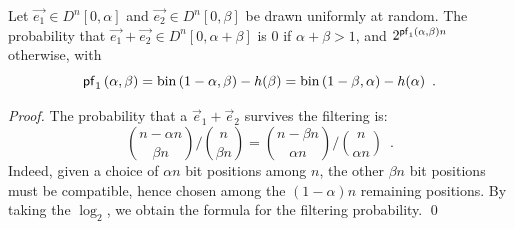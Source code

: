 \begin{lemma}
\label{lemma:hgj-filter}
Let $\vec{e_1} \in D^n[0, \alpha]$ and $\vec{e_2} \in D^n[0, \beta]$ be drawn uniformly at random. The probability that $\vec{e_1} + \vec{e_2} \in D^n[0, \alpha + \beta]$ is $0$ if $\alpha + \beta > 1$, and $2^{\mathsf{pf}_1 \left(\alpha, \beta \right)n}$ otherwise, with 
$$\mathsf{pf}_1 \left(\alpha, \beta \right) = \mathrm{bin}\left(1-\alpha,\beta\right) - h(\beta) = \mathrm{bin}\left(1-\beta,\alpha\right) - h(\alpha) \enspace.$$
\end{lemma}

\begin{proof}
The probability that a $\vec{e}_1 + \vec{e}_2$ survives the filtering is:
$$ {n - \alpha n \choose \beta n} / {n \choose \beta n} = {n - \beta n \choose \alpha n} / {n \choose \alpha n} \enspace.$$
Indeed, given a choice of $\alpha n$ bit positions among $n$, the other $\beta n$ bit positions must be compatible, hence chosen among the $(1-\alpha)n$ remaining positions. By taking the $\log_2$, we obtain the formula for the filtering probability. \qed
\end{proof}




